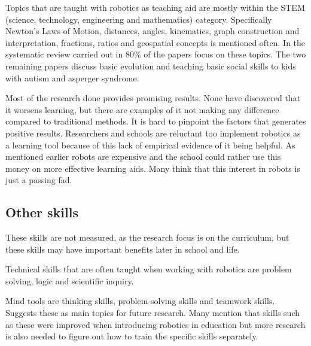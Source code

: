 Topics that are taught with robotics as teaching aid are mostly within the STEM (science, technology, engineering and mathematics) category. Specifically Newton's Laws of Motion, distances, angles, kinematics, graph construction and interpretation, fractions, ratios and geospatial concepts is mentioned often. In the systematic review carried out in \cite{Benitti2012978} 80\% of the papers focus on these topics. The two remaining papers discuss basic evolution and teaching basic social skills to kids with autism and asperger syndrome. 

\bigskip\noindent
Most of the research done provides promising results. None have discovered that it worsens learning, but there are examples of it not making any difference compared to traditional methods. It is hard to pinpoint the factors that generates positive results. Researchers and schools are reluctant too implement robotics as a learning tool because of this lack of empirical evidence of it being helpful. As mentioned earlier robots are expensive and the school could rather use this money on more effective learning aids. Many think that this interest in robots is just a passing fad. 

\subsection*{Other skills}
These skills are not measured, as the research focus is on the curriculum, but these skills may have important benefits later in school and life.

\bigskip\noindent
Technical skills that are often taught when working with robotics are problem solving, logic and scientific inquiry. 

\bigskip\noindent
Mind tools are thinking skills, problem-solving skills and teamwork skills. \cite{Benitti2012978} Suggests these as main topics for future research. Many mention that skills such as these were improved when introducing robotics in education but more research is also needed to figure out how to train the specific skills separately. 

